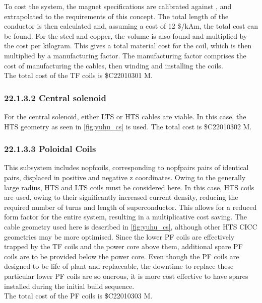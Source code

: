 To cost the system, the magnet specifications are calibrated against \cite{Menard2016}, and extrapolated to the requirements of this concept. The total length of the conductor is then calculated and, assuming a cost of 12 \$/kAm, the total cost can be found. For the steel and copper, the volume is also found and multiplied by the cost per kilogram. This gives a total material cost for the coil, which is then multiplied by a manufacturing factor. The manufacturing factor comprises the cost of manufacturing the cables, then winding and installing the coils. \\

The total cost of the TF coils is \$C22010301 M.

\subsubsection*{22.1.3.2 Central solenoid}

For the central solenoid, either LTS or HTS cables are viable. In this case, the HTS geometry as seen in \ref{fig:yuhu_cs} is used. The total cost is \$C22010302 M.

\subsubsection*{22.1.3.3 Poloidal Coils}

This subsystem includes nopfcoils, corresponding to nopfpairs pairs of identical pairs, displaced in positive and negative z coordinates. Owing to the generally large radius, HTS and LTS coils must be considered here. In this case, HTS coils are used, owing to their significantly increased current density, reducing the required number of turns and length of superconductor. This allows for a reduced form factor for the entire system, resulting in a multiplicative cost saving. The cable geometry used here is described in \ref{fig:yuhu_cs}, although other HTS CICC geometries may be more optimised.
Since the lower PF coils are effectively trapped by the TF coils and the power core above them, additional spare PF coils are to be provided below the power core. Even though the PF coils are designed to be life of plant and replaceable, the downtime to replace these particular lower PF coils are so onerous, it is more cost effective to have spares installed during the initial build sequence.  \\

The total cost of the PF coils is \$C22010303 M. \\

